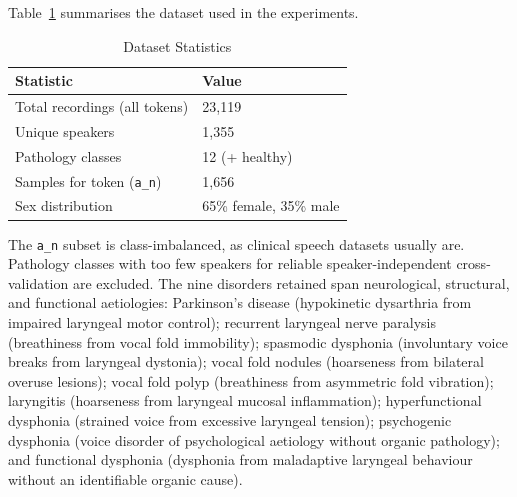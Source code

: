 \documentclass[runningheads]{llncs}
\begin{document}
  Table~\ref{tab:dataset_stats} summarises the dataset used in the experiments.

  \begin{table}[htbp]
  \centering
  \caption{Dataset Statistics}
  \label{tab:dataset_stats}
  \begin{tabular}{ll}
  \toprule
  \textbf{Statistic} & \textbf{Value} \\
  \midrule
  Total recordings (all tokens) & 23,119 \\
  Unique speakers & 1,355 \\
  Pathology classes & 12 (+ healthy) \\
  Samples for token (\texttt{a\_n}) & 1,656 \\
  Sex distribution & 65\% female, 35\% male \\
  \bottomrule
  \end{tabular}
  \end{table}

  The \texttt{a\_n} subset is class-imbalanced, as clinical speech datasets usually are. Pathology classes with too few speakers for reliable speaker-independent cross-validation are excluded. The nine disorders retained span neurological, structural, and functional aetiologies: Parkinson's disease (hypokinetic dysarthria from impaired laryngeal motor control); recurrent laryngeal nerve paralysis (breathiness from vocal fold immobility); spasmodic dysphonia (involuntary voice breaks from laryngeal dystonia); vocal fold nodules (hoarseness from bilateral overuse lesions); vocal fold polyp (breathiness from asymmetric fold vibration); laryngitis (hoarseness from laryngeal mucosal inflammation); hyperfunctional dysphonia (strained voice from excessive laryngeal tension); psychogenic dysphonia (voice disorder of psychological aetiology without organic pathology); and functional dysphonia (dysphonia from maladaptive laryngeal behaviour without an identifiable organic cause).
\end{document}
